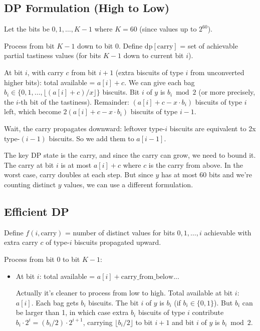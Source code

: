 \documentclass[11pt,a4paper]{article}
\begin{document}
\subsection{DP Formulation (High to Low)}
Let the bits be $0, 1, \ldots, K-1$ where $K = 60$ (since values up to $2^{60}$).

Process from bit $K-1$ down to bit 0. Define $\text{dp}[\text{carry}]$ = set of achievable partial tastiness values (for bits $K-1$ down to current bit $i$).

At bit $i$, with carry $c$ from bit $i+1$ (extra biscuits of type $i$ from unconverted higher bits): total available = $a[i] + c$. We can give each bag $b_i \in \{0, 1, \ldots, \lfloor(a[i] + c) / x\rfloor\}$ biscuits. Bit $i$ of $y$ is $b_i \bmod 2$ (or more precisely, the $i$-th bit of the tastiness). Remainder: $(a[i] + c - x \cdot b_i)$ biscuits of type $i$ left, which become $2(a[i] + c - x \cdot b_i)$ biscuits of type $i-1$.

Wait, the carry propagates downward: leftover type-$i$ biscuits are equivalent to 2x type-$(i-1)$ biscuits. So we add them to $a[i-1]$.

The key DP state is the carry, and since the carry can grow, we need to bound it. The carry at bit $i$ is at most $a[i] + c$ where $c$ is the carry from above. In the worst case, carry doubles at each step. But since $y$ has at most 60 bits and we're counting distinct $y$ values, we can use a different formulation.

\subsection{Efficient DP}
Define $f(i, \text{carry})$ = number of distinct values for bits $0, 1, \ldots, i$ achievable with extra carry $c$ of type-$i$ biscuits propagated upward.

Process from bit 0 to bit $K-1$:
\begin{itemize}
  \item At bit $i$: total available = $a[i] + \text{carry\_from\_below}$...

  Actually it's cleaner to process from low to high. Total available at bit $i$: $a[i]$. Each bag gets $b_i$ biscuits. The bit $i$ of $y$ is $b_i$ (if $b_i \in \{0, 1\}$). But $b_i$ can be larger than 1, in which case extra $b_i$ biscuits of type $i$ contribute $b_i \cdot 2^i = (b_i / 2) \cdot 2^{i+1}$, carrying $\lfloor b_i / 2 \rfloor$ to bit $i+1$ and bit $i$ of $y$ is $b_i \bmod 2$.
\end{itemize}
\end{document}
